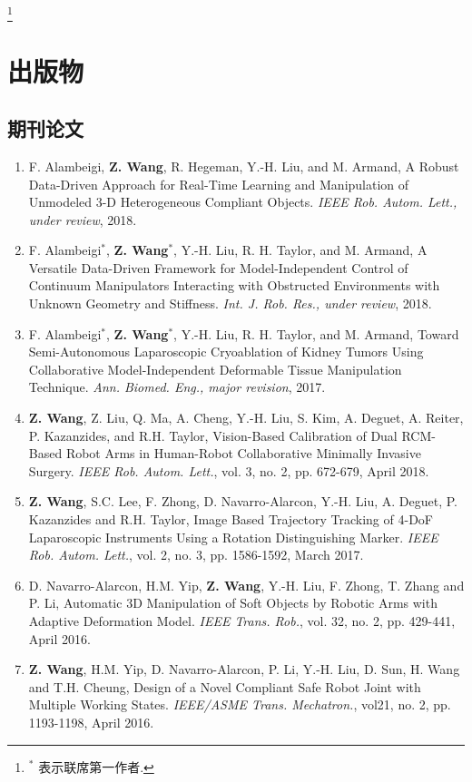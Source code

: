 \documentclass[10pt,letterpaper]{article}
\begin{document}
\let\thefootnote\relax\footnote{$^*$ 表示联席第一作者.}

\section*{出版物}

\subsection*{期刊论文}
\begin{enumerate}
    \item F. Alambeigi, \textbf{Z. Wang}, R. Hegeman, Y.-H. Liu, and M. Armand,
    A Robust Data-Driven Approach for Real-Time Learning and Manipulation of Unmodeled 3-D Heterogeneous Compliant Objects.
    \textit{IEEE Rob. Autom. Lett., under review}, 2018.
    \item F. Alambeigi$^*$, \textbf{Z. Wang}$^*$, Y.-H. Liu, R. H. Taylor, and M. Armand,
    A Versatile Data-Driven Framework for Model-Independent Control of Continuum Manipulators Interacting with Obstructed Environments with Unknown Geometry and Stiffness.
    \textit{Int. J. Rob. Res., under review}, 2018.
    \item F. Alambeigi$^*$, \textbf{Z. Wang}$^*$, Y.-H. Liu, R. H. Taylor, and M. Armand,
    Toward Semi-Autonomous Laparoscopic Cryoablation of Kidney Tumors Using Collaborative Model-Independent Deformable Tissue Manipulation Technique.
    \textit{Ann. Biomed. Eng., major revision}, 2017.
    \item \textbf{Z. Wang}, Z. Liu, Q. Ma, A. Cheng, Y.-H. Liu, S. Kim, A. Deguet, A. Reiter, P. Kazanzides, and R.H. Taylor,
    Vision-Based Calibration of Dual RCM-Based Robot Arms in Human-Robot Collaborative Minimally Invasive Surgery.
    \textit{IEEE Rob. Autom. Lett.}, vol. 3, no. 2, pp. 672-679, April 2018.
    \item \textbf{Z. Wang}, S.C. Lee, F. Zhong, D. Navarro-Alarcon, Y.-H. Liu, A. Deguet, P. Kazanzides and R.H. Taylor,
    Image Based Trajectory Tracking of 4-DoF Laparoscopic Instruments Using a Rotation Distinguishing Marker.
    \textit{IEEE Rob. Autom. Lett.}, vol. 2, no. 3, pp. 1586-1592, March 2017.
    \item D. Navarro-Alarcon, H.M. Yip, \textbf{Z. Wang}, Y.-H. Liu, F. Zhong, T. Zhang and P. Li,
    Automatic 3D Manipulation of Soft Objects by Robotic Arms with Adaptive Deformation Model.
    \textit{{IEEE} Trans. Rob.}, vol. 32, no. 2, pp. 429-441, April 2016.
    \item \textbf{Z. Wang}, H.M. Yip, D. Navarro-Alarcon, P. Li, Y.-H. Liu, D. Sun, H. Wang and T.H. Cheung,
    Design of a Novel Compliant Safe Robot Joint with Multiple Working States.
    \textit{{IEEE/ASME} Trans. Mechatron.}, vol21, no. 2, pp. 1193-1198, April 2016.
\end{enumerate}
\end{document}
